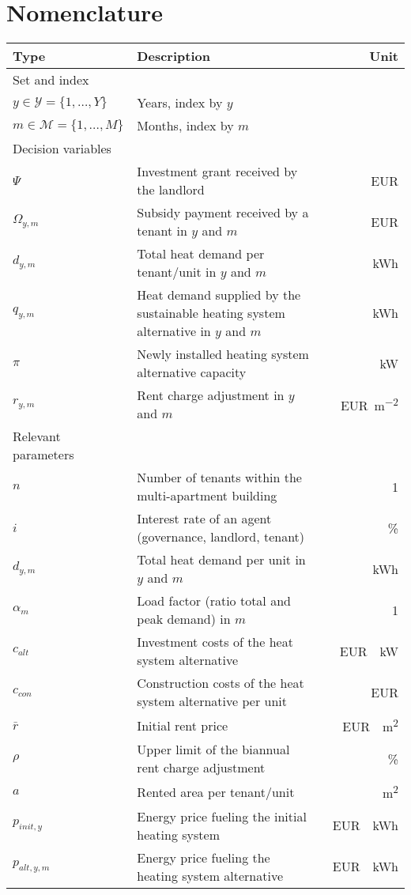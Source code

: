 \documentclass[review]{elsarticle}
\begin{document}
\section*{Nomenclature}
\begin{center}
	\renewcommand{\arraystretch}{1.1}
	\centering
	\small
	\begin{tabular}{lm{8cm}r}
		Type & Description & Unit\\
		\hline
		Set and index & & \\
		\hline
		
		{$y \in \mathcal{Y}=\{1,\ldots,Y\}$} & Years, index by $y$\\
		{$m \in \mathcal{M}=\{1,\ldots,M\}$} & Months, index by $m$\\
		\hline
		Decision variables\\
		\hline
		{$\Psi$} & Investment grant received by the landlord & \SI{}{EUR}\\
		{$\Omega_{y,m}$} & Subsidy payment received by a tenant in $y$ and $m$ & \SI{}{EUR}\\
		{$d_{y,m}$} & Total heat demand per tenant/unit in $y$ and $m$& \SI{}{kWh}\\
		{$q_{y,m}$} & Heat demand supplied by the sustainable heating system alternative in $y$ and $m$& \SI{}{kWh}\\
		{$\pi$} & Newly installed heating system alternative capacity & \SI{}{kW}\\
		{$r_{y,m}$} & Rent charge adjustment in $y$ and $m$ & \SI{}{EUR\per m^2}\\
		\hline
		Relevant parameters\\
		\hline
		{$n$} & Number of tenants within the multi-apartment building & \SI{}{1}\\
		{$i$} & Interest rate of an agent (governance, landlord, tenant)& \SI{}{\%}\\
		{$d_{y,m}$} & Total heat demand per unit in $y$ and $m$ & \SI{}{kWh}\\
		{$\alpha_{m}$} & Load factor (ratio total and peak demand) in $m$ & \SI{}{1}\\
		{$c_{alt}$} & Investment costs of the heat system alternative& \SI{}{EUR \per kW}\\
		{$c_{con}$} & Construction costs of the heat system alternative per unit & \SI{}{EUR}\\
		{$\bar{r}$} & Initial rent price & \SI{}{EUR \per m^2}\\
		{$\rho$} & Upper limit of the biannual rent charge adjustment & \SI{}{\%}\\
		{$a$} & Rented area per tenant/unit & \SI{}{m^2}\\
		{$p_{init,y}$} & Energy price fueling the initial heating system & \SI{}{EUR \per kWh}\\
		{$p_{alt,y,m}$} & Energy price fueling the heating system alternative & \SI{}{EUR \per kWh}\\
		\hline
	\end{tabular}
\end{center}
\newpage
\end{document}
